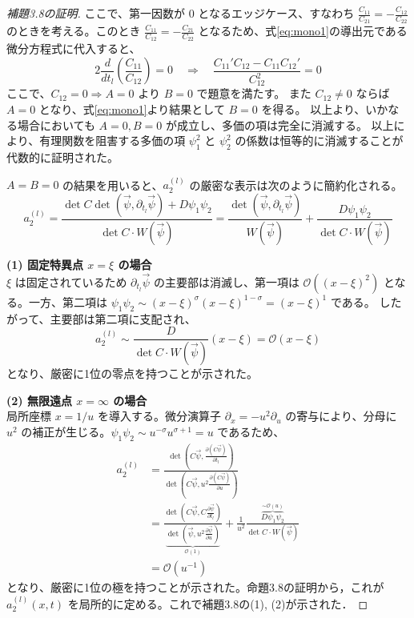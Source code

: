 \documentclass[paper=a4, fontsize=11pt]{jlreq} %
\newenvironment{story}{%
  \begin{mdframed}[
    backgroundcolor=red!5, %
    linewidth=0pt,         %
    innertopmargin=10pt,   %
    innerbottommargin=10pt,
    innerrightmargin=10pt, %
    innerleftmargin=10pt
  ]%
}{%
  \end{mdframed}%
}
\theoremstyle{break}
\theoremstyle{qa}
\begin{document}
\begin{story}
\begin{proof}[補題3.8の証明]
ここで、第一因数が $0$ となるエッジケース、すなわち $\frac{C_{11}}{C_{21}} = - \frac{C_{12}}{C_{22}}$ のときを考える。このとき $\frac{C_{11}}{C_{12}} = -\frac{C_{21}}{C_{22}}$ となるため、式\eqref{eq:mono1}の導出元である微分方程式に代入すると、
\begin{equation*}
    2 \frac{d}{dt_l}\left(\frac{C_{11}}{C_{12}}\right) = 0 \quad \Longrightarrow \quad \frac{C_{11}'C_{12} - C_{11}C_{12}'}{C_{12}^2} = 0
\end{equation*}
ここで、$C_{12} = 0 \Rightarrow A=0$ より $B=0$ で題意を満たす。
また $C_{12} \neq 0$ ならば $A=0$ となり、式\eqref{eq:mono1}より結果として $B=0$ を得る。
以上より、いかなる場合においても $A=0, B=0$ が成立し、多価の項は完全に消滅する。
以上により、有理関数を阻害する多価の項 $\psi_1^2$ と $\psi_2^2$ の係数は恒等的に消滅することが代数的に証明された。

$A=B=0$ の結果を用いると、$a_2^{(l)}$ の厳密な表示は次のように簡約化される。
\begin{equation}
    a_2^{(l)} = \frac{\det C \det(\vec{\psi}, \partial_{t_l}\vec{\psi}) + D\psi_1\psi_2}{\det C \cdot W(\vec{\psi})} = \frac{\det(\vec{\psi}, \partial_{t_l}\vec{\psi})}{W(\vec{\psi})} + \frac{D\psi_1\psi_2}{\det C \cdot W(\vec{\psi})}
\end{equation}

\textbf{(1) 固定特異点 $x=\xi$ の場合} \\
$\xi$ は固定されているため $\partial_{t_l}\vec{\psi}$ の主要部は消滅し、第一項は $\mathcal{O}((x-\xi)^2)$ となる。一方、第二項は $\psi_1\psi_2 \sim (x-\xi)^\sigma (x-\xi)^{1-\sigma} = (x-\xi)^1$ である。
したがって、主要部は第二項に支配され、
\begin{equation}
    a_2^{(l)} \sim \frac{D}{\det C \cdot W(\vec{\psi})} (x-\xi) = \mathcal{O}(x-\xi)
\end{equation}
となり、厳密に1位の零点を持つことが示された。

\textbf{(2) 無限遠点 $x=\infty$ の場合} \\
局所座標 $x=1/u$ を導入する。微分演算子 $\partial_x = -u^2 \partial_u$ の寄与により、分母に $u^2$ の補正が生じる。$\psi_1\psi_2 \sim u^{-\sigma} u^{\sigma+1} = u$ であるため、
\begin{align*}
    a_2^{(l)} &= \frac{\det\left(C\vec{\psi}, \frac{\partial (C\vec{\psi})}{\partial t_l}\right)}{\det\left(C\vec{\psi}, u^2 \frac{\partial (C\vec{\psi})}{\partial u}\right)} \\[8pt]
    &= \frac{\det\left(C\vec{\psi}, C\frac{\partial \vec{\psi}}{\partial t_l}\right)}{\underbrace{\det\left(\vec{\psi}, u^2 \frac{\partial \vec{\psi}}{\partial u}\right)}_{\mathcal{O}(1)}} + \frac{1}{u^2} \frac{\overbrace{D\psi_1\psi_2}^{\sim \mathcal{O}(u)}}{\det C \cdot W(\vec{\psi})} \\[8pt]
    &= \mathcal{O}(u^{-1})
\end{align*}
となり、厳密に1位の極を持つことが示された。命題3.8の証明から，これが $a_2^{(l)}(x,t)$ を局所的に定める。これで補題3.8の(1), (2)が示された．


\end{proof}
\end{story}
\end{document}
